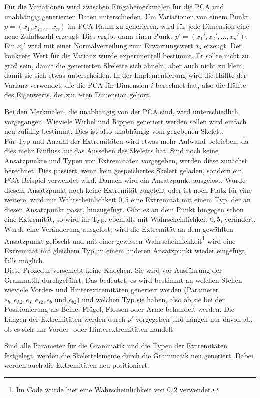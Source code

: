 Für die Variationen wird zwischen Eingabemerkmalen für die PCA und unabhängig generierten Daten unterschieden. Um Variationen von einem Punkt $p = (x_1, x_2,\dots, x_n)$ im PCA-Raum zu generieren, wird für jede Dimension eine neue Zufallszahl erzeugt. Dies ergibt dann einen Punkt $p' = (x_1', x_2',\dots,x_n')$. Ein $x_i'$ wird mit einer Normalverteilung zum Erwartungswert $x_i$ erzeugt.
Der konkrete Wert für die Varianz wurde experimentell bestimmt. Er sollte nicht zu groß sein, damit die generierten Skelette sich ähneln, aber auch nicht zu klein, damit sie sich etwas unterscheiden. In der Implementierung wird
die Hälfte der Varianz verwendet, die die PCA für Dimension $i$ berechnet hat, also die Hälfte des Eigenwerts, der zur $i$-ten Dimension gehört. 

Bei den Merkmalen, die unabhängig von der PCA sind, wird unterschiedlich vorgegangen. Wieviele Wirbel und Rippen generiert werden sollen wird einfach neu zufällig bestimmt. Dies ist also unabhängig vom gegebenen Skelett.\\
Für Typ und Anzahl der Extremitäten wird etwas mehr Aufwand betrieben, da dies mehr Einfluss auf das Aussehen des Skeletts hat.
Sind noch keine Ansatzpunkte und Typen von Extremitäten vorgegeben, werden diese zunächst berechnet. Dies passiert, wenn kein gespeichertes Skelett geladen, sondern ein PCA-Beispiel verwendet wird.
Danach wird ein Ansatzpunkt ausgelost. Wurde diesem Ansatzpunkt noch keine Extremität zugeteilt oder ist noch Platz für eine weitere, wird mit Wahrscheinlichkeit $0{,}5$ eine Extremität mit einem Typ, der an diesen Ansatzpunkt passt, hinzugefügt. Gibt es an dem Punkt hingegen schon eine Extremität, so wird ihr Typ, ebenfalls mit Wahrscheinlichkeit $0{,}5$, verändert. Wurde eine Veränderung ausgelost, wird die Extremität an dem gewählten Ansatzpunkt gelöscht und mit einer gewissen Wahrscheinlichkeit\footnote{Im Code wurde hier eine Wahrscheinlichkeit von $0{,}2$ verwendet.} wird eine Extremität mit gleichem Typ an einem anderen Ansatzpunkt wieder eingefügt, falls möglich.\\
Diese Prozedur verschiebt keine Knochen. Sie wird vor Ausführung der Grammatik durchgeführt. Das bedeutet, es wird bestimmt an welchen Stellen wieviele Vorder- und Hinterextremitäten generiert werden (Parameter $e_h, e_{h2}, e_s, e_{s2}, e_b$ und $e_{b2}$) und welchen Typ sie haben, also ob sie bei der Positionierung als Beine, Flügel, Flossen oder Arme behandelt werden.
Die Längen der Extremitäten werden durch $p'$ vorgegeben und hängen nur davon ab, ob es sich um Vorder- oder Hinterextremitäten handelt.

Sind alle Parameter für die Grammatik und die Typen der Extremitäten festgelegt, werden die Skelettelemente durch die Grammatik neu generiert. Dabei werden auch die Extremitäten neu positioniert.

